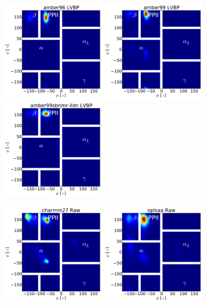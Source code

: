 \documentclass[journal=jacsat,manuscript=article]{achemso}
\begin{document}
\begin{figure}
\includegraphics[width=5.25cm]{figures/ALA3_rama_amber96_lvbp.pdf}
\includegraphics[width=5.25cm]{figures/ALA3_rama_amber99_lvbp.pdf}
\includegraphics[width=5.25cm]{figures/ALA3_rama_amber99sbnmr-ildn_lvbp.pdf}

\includegraphics[width=5.25cm]{figures/ALA3_rama_charmm27_raw.pdf}
\includegraphics[width=5.25cm]{figures/ALA3_rama_oplsaa_raw.pdf}


\end{figure}
\end{document}
